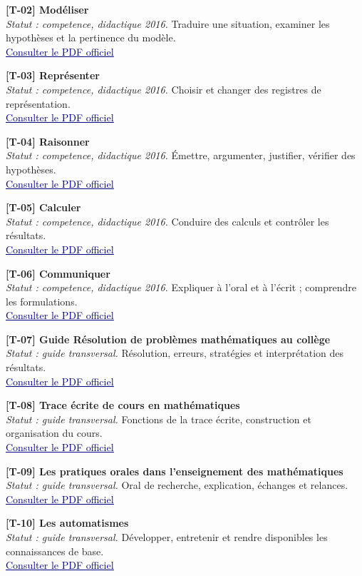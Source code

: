 \documentclass[11pt,a4paper]{article}
\newcommand{\refsource}[1]{\textsf{\textcolor{slate}{[#1]}}}
\newcommand{\entreesource}[5]{\par\noindent\textbf{\refsource{#1} #2}\\[-2pt]\textit{Statut : #3.} #4\\[-2pt]\href{#5}{\textcolor{navy}{\underline{Consulter le PDF officiel}}}\par\smallskip}
\begin{document}
\entreesource{T-02}{Modéliser}{competence, didactique 2016}{Traduire une situation, examiner les hypothèses et la pertinence du modèle.}{https://eduscol.education.gouv.fr/sites/default/files/document/ra16c4mathmodelisernd566177pdf-77586.pdf}

\entreesource{T-03}{Représenter}{competence, didactique 2016}{Choisir et changer des registres de représentation.}{https://eduscol.education.gouv.fr/sites/default/files/document/ra16c4mathrepresenternd566207pdf-77589.pdf}

\entreesource{T-04}{Raisonner}{competence, didactique 2016}{Émettre, argumenter, justifier, vérifier des hypothèses.}{https://eduscol.education.gouv.fr/sites/default/files/document/ra16c4mathraisonner547836pdf-77592.pdf}

\entreesource{T-05}{Calculer}{competence, didactique 2016}{Conduire des calculs et contrôler les résultats.}{https://eduscol.education.gouv.fr/sites/default/files/document/ra16c4mathcompcalculer554370pdf-77595.pdf}

\entreesource{T-06}{Communiquer}{competence, didactique 2016}{Expliquer à l’oral et à l’écrit ; comprendre les formulations.}{https://eduscol.education.gouv.fr/sites/default/files/document/ra16c4mathcommecritoralpourmontage548548pdf-77598.pdf}

\entreesource{T-07}{Guide Résolution de problèmes mathématiques au collège}{guide transversal}{Résolution, erreurs, stratégies et interprétation des résultats.}{https://eduscol.education.gouv.fr/sites/default/files/document/guide-resolution-de-problemes-mathematiques-au-college-73914.pdf}

\entreesource{T-08}{Trace écrite de cours en mathématiques}{guide transversal}{Fonctions de la trace écrite, construction et organisation du cours.}{https://eduscol.education.gouv.fr/sites/default/files/document/trace-ecrite-de-cours-en-mathspdf-91731.pdf}

\entreesource{T-09}{Les pratiques orales dans l’enseignement des mathématiques}{guide transversal}{Oral de recherche, explication, échanges et relances.}{https://eduscol.education.gouv.fr/sites/default/files/document/les-pratiques-orales-dans-lenseignement-des-mathspdf-91728.pdf}

\entreesource{T-10}{Les automatismes}{guide transversal}{Développer, entretenir et rendre disponibles les connaissances de base.}{https://eduscol.education.gouv.fr/sites/default/files/document/automatismes-mathematiquespdf-91875.pdf}
\end{document}
